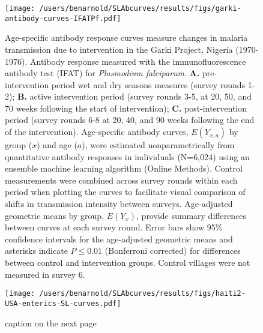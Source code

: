\documentclass[11pt]{article}
\begin{document}
\begin{figure}[htbp]
\begin{center}
\texttt{[image: /users/benarnold/SLAbcurves/results/figs/garki-antibody-curves-IFATPf.pdf]}
\begin{minipage}{\textwidth}
\caption{Age-specific antibody response curves measure changes in malaria transmission due to intervention in the Garki Project, Nigeria (1970-1976). Antibody response measured with the immunofluorescence antibody test (IFAT) for \textit{Plasmodium falciparum}. \textbf{A.} pre-intervention period wet and dry seasons measures (survey rounds 1-2); \textbf{B.} active intervention period (survey rounds 3-5, at 20, 50, and 70 weeks following the start of intervention); \textbf{C.} post-intervention period (survey rounds 6-8 at 20, 40, and 90 weeks following the end of the intervention).  Age-specific antibody curves, $E(Y_{x,a})$ by group ($x$) and age ($a$), were estimated nonparametrically from quantitative antibody responses in individuals (N=6,024) using an ensemble machine learning algorithm (Online Methods). Control measurements were combined across survey rounds within each period when plotting the curves to facilitate visual comparison of shifts in transmission intensity between surveys. Age-adjusted geometric means by group, $E(Y_x)$, provide summary differences between curves at each survey round. Error bars show 95\% confidence intervals for the age-adjusted geometric means and asterisks indicate $P\leq0.01$ (Bonferroni corrected) for differences between control and intervention groups. Control villages were not measured in survey 6.  }
\label{fig:garki}
\end{minipage}
\end{center}
\end{figure}



\begin{figure}[htbp]
\begin{center}
\texttt{[image: /users/benarnold/SLAbcurves/results/figs/haiti2-USA-enterics-SL-curves.pdf]}
\begin{minipage}{\textwidth}
\caption{caption on the next page}
\label{fig:enterics}
\end{minipage}
\end{center}
\end{figure}
\end{document}

